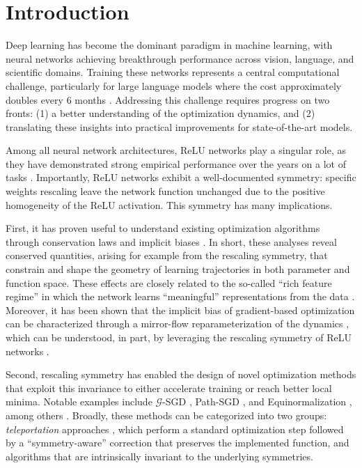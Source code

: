 \documentclass{article}
\theoremstyle{plain}
\theoremstyle{definition}
\theoremstyle{remark}
\begin{document}
\section{Introduction}

Deep learning has become the dominant paradigm in machine learning, with neural networks achieving breakthrough performance across vision, language, and scientific domains.
Training these networks represents a central computational challenge, particularly for large language models where the cost approximately doubles every $6$ months \citep{sastry2024computing}.
Addressing this challenge requires progress on two fronts: (1) a better understanding of the optimization dynamics, and (2) translating these insights into practical improvements for state-of-the-art models.


Among all neural network architectures, ReLU networks play a singular role, 
as they have demonstrated strong empirical performance over the years on a lot of tasks 
\citep{krizhevsky2012imagenet, szegedy2015going, howard2017mobilenets,silver2016mastering,dosovitskiy2021an}.
Importantly, ReLU networks exhibit a well-documented symmetry: specific weights rescaling  
leave the network function unchanged due to the positive homogeneity of the ReLU activation.
This symmetry has many implications.  

First, it has proven useful to understand existing optimization algorithms through conservation laws 
and implicit biases \citep{du2018algorithmic, kunin2021neural, marcotte2023abide, zhao2023symmetries}. 
In short, these analyses reveal conserved quantities, arising for example from the rescaling symmetry, 
that constrain and shape the geometry of learning trajectories in both parameter and function space. 
These effects are closely related to the so-called ``rich feature regime'' in which the network learns ``meaningful'' representations 
from the data \citep{kunin2024get, domine2025from}. 
Moreover, it has been shown that the implicit bias of gradient-based optimization can be characterized through a mirror-flow 
reparameterization of the dynamics \citep{gunasekar18a, azulay21a}, which can be understood, in part, 
by leveraging the rescaling symmetry of ReLU networks \citep{marcotte2025intrinsic}.


Second, rescaling symmetry has enabled the design of novel optimization methods that exploit this invariance
to either accelerate training or reach better local minima. Notable examples include $\mathcal{G}$-SGD \citep{meng2018gsgd}, 
Path-SGD \citep{neyshabur2015path}, and Equinormalization \citep{stock2019equinormalizationneuralnetworks}, 
among others \citep{badrinarayanan2015symmetry, saul2023weightbalancing, mustafa2024dynamic}. 
Broadly, these methods can be categorized into two groups: \emph{teleportation} approaches \citep{zhao2022symmetry, armenta2023neural}, 
which perform a standard optimization step followed by a ``symmetry-aware'' correction that preserves the implemented function, 
and algorithms that are intrinsically invariant to the underlying symmetries.
\end{document}

